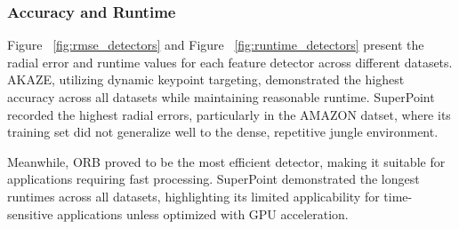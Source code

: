 \subsubsection*{Accuracy and Runtime}

Figure ~\ref{fig:rmse_detectors} and Figure ~\ref{fig:runtime_detectors} present the radial error and runtime values for each feature detector across different datasets. AKAZE, utilizing dynamic keypoint targeting, demonstrated the highest accuracy across all datasets while maintaining reasonable runtime. SuperPoint recorded the highest radial errors, particularly in the AMAZON datset, where its training set did not generalize well to the dense, repetitive jungle environment. 

Meanwhile, ORB proved to be the most efficient detector, making it suitable for applications requiring fast processing. SuperPoint demonstrated the longest runtimes across all datasets, highlighting its limited applicability for time-sensitive applications unless optimized with GPU acceleration.

